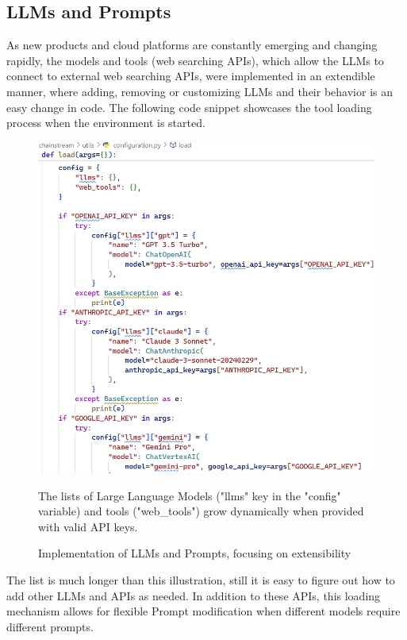 \subsection{LLMs and Prompts}
As new products and cloud platforms are constantly emerging and changing rapidly, the models and tools (web searching APIs), which allow the LLMs to connect to external web searching APIs, were implemented in an extendible manner, where adding, removing or customizing LLMs and their behavior is an easy change in code. The following code snippet showcases the tool loading process when the environment is started.
\begin{figure}[htbp]
    \centering
    \includegraphics[width=.9\linewidth]{./figures/llms-implementation.png}
    \caption{Implementation of LLMs and Prompts, focusing on extensibility}
    \begin{flushleft}
        \small The lists of Large Language Models ("llms" key in the "config" variable) and tools ("web\_tools") grow dynamically when provided with valid API keys.
    \end{flushleft}
\end{figure}\newline
The list is much longer than this illustration, still it is easy to figure out how to add other LLMs and APIs as needed.\newline
In addition to these APIs, this loading mechanism allows for flexible Prompt modification when different models require different prompts.
